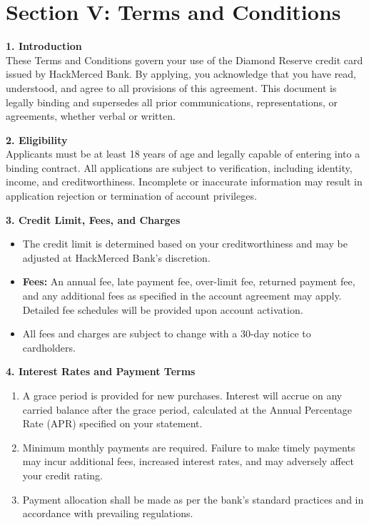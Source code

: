 \documentclass[12pt,a4paper]{article}
\begin{document}
\section*{Section V: Terms and Conditions}
\begin{spacing}{1.1}
\textbf{1. Introduction}\\[1ex]
These Terms and Conditions govern your use of the Diamond Reserve credit card issued by HackMerced Bank. By applying, you acknowledge that you have read, understood, and agree to all provisions of this agreement. This document is legally binding and supersedes all prior communications, representations, or agreements, whether verbal or written.

\vspace{1em}
\textbf{2. Eligibility}\\[1ex]
Applicants must be at least 18 years of age and legally capable of entering into a binding contract. All applications are subject to verification, including identity, income, and creditworthiness. Incomplete or inaccurate information may result in application rejection or termination of account privileges.

\vspace{1em}
\textbf{3. Credit Limit, Fees, and Charges}\\[1ex]
\begin{itemize}
    \item The credit limit is determined based on your creditworthiness and may be adjusted at HackMerced Bank’s discretion.
    \item \textbf{Fees:} An annual fee, late payment fee, over-limit fee, returned payment fee, and any additional fees as specified in the account agreement may apply. Detailed fee schedules will be provided upon account activation.
    \item All fees and charges are subject to change with a 30-day notice to cardholders.
\end{itemize}

\vspace{1em}
\textbf{4. Interest Rates and Payment Terms}\\[1ex]
\begin{enumerate}[label*=\arabic*.]
    \item A grace period is provided for new purchases. Interest will accrue on any carried balance after the grace period, calculated at the Annual Percentage Rate (APR) specified on your statement.
    \item Minimum monthly payments are required. Failure to make timely payments may incur additional fees, increased interest rates, and may adversely affect your credit rating.
    \item Payment allocation shall be made as per the bank’s standard practices and in accordance with prevailing regulations.
\end{enumerate}


\end{spacing}
\end{document}
